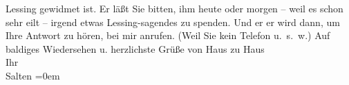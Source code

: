 \begin{ledgroupsized}[t]{13cm}
                  Lessing gewidmet ist. Er läßt Sie bitten,
               ihm heute oder morgen – weil es schon sehr eilt – irgend etwas Lessing-sagendes zu spenden. Und er er wird dann, um Ihre
               Antwort zu hören, bei mir anrufen. (Weil Sie kein Telefon u. s. w.)\pend
           \pstart
           Auf baldiges Wiedersehen u. herzlichste Grüße von Haus zu Haus {\\[\baselineskip]}Ihr {\\[\baselineskip]}\spacefill\mbox{Salten}\pend
           \leftskip=0em{}
         
         \endnumbering{}\end{ledgroupsized}\begin{anhang}\end{anhang}\newcommand{\dateiname}{L03555}\newcommand{\titel}{Felix Salten an Arthur Schnitzler, [26. 1. 1912]}\newcommand{\editorInnen}{Martin Anton Müller und Laura Untner}
      